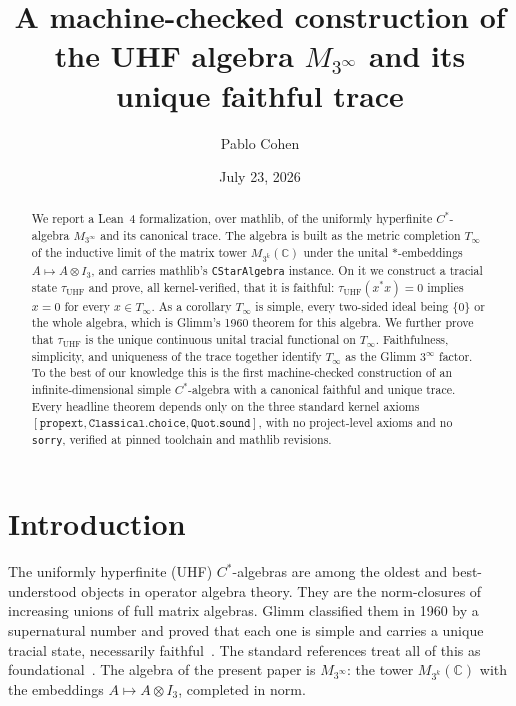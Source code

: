 \documentclass[11pt,reqno]{amsart}
\title[A machine-checked UHF algebra and its unique faithful trace]{A
machine-checked construction of the UHF algebra
\texorpdfstring{$M_{3^\infty}$}{M(3\textasciicircum\ensuremath{\infty})}
and its unique faithful trace}
\author{Pablo Cohen}
\date{July 23, 2026}
\theoremstyle{plain}
\theoremstyle{definition}
\theoremstyle{remark}
\newcommand{\Tinf}{T_\infty}
\newcommand{\tuhf}{\tau_{\mathrm{UHF}}}
\begin{document}
\begin{abstract}
We report a Lean~4 formalization, over mathlib, of the uniformly
hyperfinite $C^*$-algebra $M_{3^\infty}$ and its canonical trace. The
algebra is built as the metric completion $\Tinf$ of the inductive limit
of the matrix tower $M_{3^k}(\mathbb{C})$ under the unital $*$-embeddings
$A \mapsto A \otimes I_3$, and carries mathlib's \texttt{CStarAlgebra}
instance. On it we construct a tracial state $\tuhf$ and prove, all
kernel-verified, that it is faithful: $\tuhf(x^*x) = 0$ implies $x = 0$ for
every $x \in \Tinf$. As a corollary $\Tinf$ is simple, every two-sided
ideal being $\{0\}$ or the whole algebra, which is Glimm's 1960 theorem for
this algebra. We further prove that $\tuhf$ is the unique continuous unital
tracial functional on $\Tinf$. Faithfulness, simplicity, and uniqueness of
the trace together identify $\Tinf$ as the Glimm $3^\infty$ factor. To the
best of our knowledge this is the first machine-checked construction of an
infinite-dimensional simple $C^*$-algebra with a canonical faithful and
unique trace. Every headline theorem depends only on the three standard
kernel axioms $[\texttt{propext}, \texttt{Classical.choice},
\texttt{Quot.sound}]$, with no project-level axioms and no \texttt{sorry},
verified at pinned toolchain and mathlib revisions.
\end{abstract}

\maketitle

\section{Introduction}\label{sec:intro}

The uniformly hyperfinite (UHF) $C^*$-algebras are among the oldest and
best-understood objects in operator algebra theory. They are the
norm-closures of increasing unions of full matrix algebras. Glimm
classified them in 1960 by a supernatural number and proved that each one
is simple and carries a unique tracial state, necessarily
faithful~\cite{glimm1960}. The standard references treat all of this as
foundational~\cite{davidson1996,blackadar2006,takesaki1979}. The algebra
of the present paper is $M_{3^\infty}$: the tower $M_{3^k}(\mathbb{C})$ with
the embeddings $A \mapsto A \otimes I_3$, completed in norm.
\end{document}
